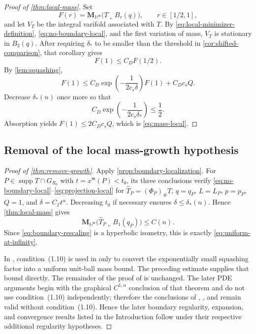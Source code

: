 \documentclass[11pt,reqno]{amsart}
\numberwithin{equation}{section}
\theoremstyle{definition}
\theoremstyle{remark}
\newcommand{\Hyp}{\mathbb H}
\newcommand{\Mass}{\mathbf M}
\newcommand{\supp}{\operatorname{supp}}
\newcommand{\restr}{\mathbin{\llcorner}}
\begin{document}
\begin{proof}[Proof of \cref{thm:local-mass}]
Set
\[
 F(r)=\Mass_{\Hyp^{\mathfrak m}}\bigl(T\restr B_r(q)\bigr),
 \qquad r\in[1/2,1],
\]
and let $V_T$ be the integral varifold associated with $T$.  By
\eqref{eq:local-minimizer-definition}, \eqref{eq:no-boundary-local}, and the
first variation of mass, $V_T$ is stationary in $B_2(q)$.  After requiring
$\delta_*$ to be smaller than the threshold in
\cref{cor:shifted-comparison}, that corollary gives
\begin{equation}\label{eq:doubling-F}
 F(1)\le C_DF(1/2).
\end{equation}
By \cref{lem:squashing},
\[
 F(1)
 \le C_D\exp\!\left(-\frac{1}{2c_s\delta}\right)F(1)
      +C_Dc_sQ.
\]
Decrease $\delta_*(n)$ once more so that
\[
 C_D\exp\!\left(-\frac{1}{2c_s\delta_*}\right)\le\frac12.
\]
Absorption yields $F(1)\le2C_Dc_sQ$, which is
\eqref{eq:mass-local}.
\end{proof}

\subsection{Removal of the local mass-growth hypothesis}

\begin{proof}[Proof of \cref{thm:remove-growth}]
Apply \cref{prop:boundary-localization}.  For
$P\in\supp T\cap G_{R_0}$ with $t=x^{\mathfrak m}(P)<t_0$, its three
conclusions verify \eqref{eq:no-boundary-local}--\eqref{eq:projection-local}
for $\widehat T_P=(\Phi_P)_\#T$, $q=q_P$, $L=L_P$, $p=p_P$, $Q=1$, and
$\delta=C_\Gamma t^\alpha$.  Decreasing $t_0$ if necessary ensures
$\delta\le\delta_*(n)$.  Hence \cref{thm:local-mass} gives
\[
 \Mass_{\Hyp^{\mathfrak m}}
 \bigl(\widehat T_P\restr B_1(q_P)\bigr)\le C(n).
\]
Since \eqref{eq:boundary-rescaling} is a hyperbolic isometry, this is exactly
\eqref{eq:uniform-at-infinity}.

In \cite{JiangXie}, condition~(1.10) is used in
\cite[Lemma~3.4]{JiangXie} only to convert the exponentially small squashing
factor into a uniform unit-ball mass bound.  The preceding estimate supplies
that bound directly.  The remainder of the proof of
\cite[Theorem~1.4]{JiangXie} is unchanged.  The later PDE arguments begin
with the graphical $C^{1,\alpha}$ conclusion of that theorem and do not use
condition~(1.10) independently; therefore the conclusions of
\cite[Theorems~1.6, 1.7, 1.9, and~1.10]{JiangXie},
\cite[Corollary~1.8]{JiangXie}, and \cite[Theorem~7.4]{JiangXie} remain valid without condition~(1.10).  Hence the later boundary regularity,
expansion, and convergence results listed in the Introduction follow under
their respective additional regularity hypotheses.
\end{proof}
\end{document}
